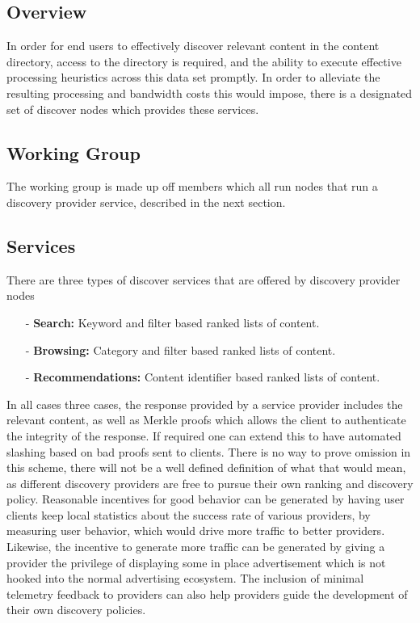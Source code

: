 \documentclass{article}
\begin{document}
\subsection{Overview}
In order for end users to effectively discover relevant content in the content directory, access to the directory is required, and the ability to execute effective processing heuristics across this data set promptly. In order to alleviate the resulting processing and bandwidth costs this would impose, there is a designated set of discover nodes which provides these services.

\subsection{Working Group}

The working group is made up off members which all run nodes that run a discovery provider service, described in the next section.

\subsection{Services}

There are three types of discover services that are offered by discovery provider nodes

\begin{enumerate}
    \item[-] \textbf{Search:} Keyword and filter based ranked lists of content.
    \item[-] \textbf{Browsing:} Category and filter based ranked lists of content.
    \item[-] \textbf{Recommendations:} Content identifier based ranked lists of content.
\end{enumerate}

In all cases three cases, the response provided by a service provider includes the relevant content, as well as Merkle proofs which allows the client to authenticate the integrity of the response. If required one can extend this to have automated slashing based on bad proofs sent to clients. There is no way to prove omission in this scheme, there will not be a well defined definition of what that would mean, as different discovery providers are free to pursue their own ranking and discovery policy. Reasonable incentives for good behavior can be generated by having user clients keep local statistics about the success rate of various providers, by measuring user behavior, which would drive more traffic to better providers. Likewise, the incentive to generate more traffic can be generated by giving a provider the privilege of displaying some in place advertisement which is not hooked into the normal advertising ecosystem. The inclusion of minimal telemetry feedback to providers can also help providers guide the development of their own discovery policies.
\end{document}
